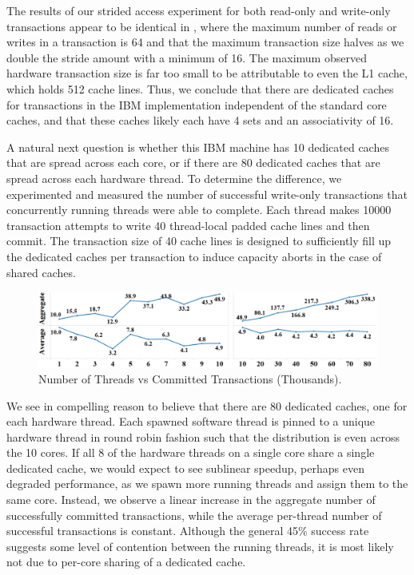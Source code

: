 The results of our strided access experiment for 
both read-only and write-only
transactions appear to be identical in
, where
the maximum number of reads or writes in a transaction
is 64 and that the maximum transaction size 
halves as we double the stride amount with a minimum
of 16.  The maximum observed hardware transaction size is far too
small to be attributable to even the {L1} cache, which holds 512 cache
lines.   Thus, we conclude that there are dedicated caches 
for transactions in the IBM implementation independent
of the standard core caches, and that
these caches likely each have 4 sets and an associativity of 16.


A natural next question is whether this IBM machine 
has 10 dedicated caches that
are spread across each core, or if there are 80 
dedicated caches that are spread
across each hardware thread. To determine the 
difference, we experimented and
measured the number of successful write-only 
transactions that concurrently
running threads were able to complete. Each 
thread makes 10000 transaction
attempts to write 40 thread-local padded cache 
lines and then commit. The
transaction size of 40 cache lines is designed 
to sufficiently fill up the
dedicated caches per transaction to induce capacity 
aborts in the case of shared
caches.

\begin{figure}[H]%
\centering
\includegraphics[width=\linewidth]{images/wttm_core_or_thread_ibm}
\caption{Number of Threads vs Committed Transactions (Thousands).}
\label{fig:wttm_core_or_thread_ibm}
\end{figure}


We see in  compelling 
reason to believe that
there are 80 dedicated caches, one for each hardware 
thread. Each spawned
software thread is pinned to a unique hardware thread 
in round robin fashion
such that the distribution is even across the 10 cores. 
If all 8 of the
hardware threads on a single core share a single 
dedicated cache, we would
expect to see sublinear speedup, perhaps even degraded 
performance, as we spawn
more running threads and assign them to the same core. 
Instead, we observe a
linear increase in the aggregate number of successfully 
committed transactions,
while the average per-thread number of successful 
transactions is constant.
Although the general 45\% success rate suggests some 
level of contention between
the running threads, it is most likely not due to 
per-core sharing of a
dedicated cache.
 



